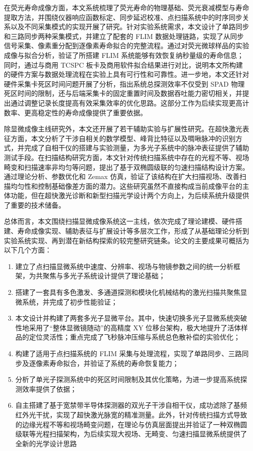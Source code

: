 在荧光寿命成像方面，本文系统梳理了荧光寿命的物理基础、荧光衰减模型与寿命提取方法，并围绕仪器响应函数标定、同步延迟校准、点扫描系统中的时序同步关系以及不同采集模式的实现开展了研究。针对实验系统需求，本文设计了单路同步和三路同步两种采集模式，并建立了配套的 FLIM 数据处理链路，实现了从同步信号采集、像素重分配到逐像素寿命拟合的完整流程。通过对荧光微球样品的实验成像与拟合分析，验证了所搭建 FLIM 系统能够有效恢复纳秒量级的寿命信息；同时，通过与商用 TCSPC 板卡及商用软件拟合结果进行对比，说明本文所构建的硬件方案与数据处理流程在实验上具有可行性和可靠性。进一步地，本文还针对硬件采集卡死区时间问题开展了分析，指出系统总探测效率不仅受到 SPAD 物理死区时间的限制，还与后端采集卡的固定重置时间及数据吞吐能力密切相关，并提出通过调整记录长度提高有效采集效率的优化思路。这部分工作为后续实现更高计数率、更高稳定性的寿命成像提供了重要依据。

除显微成像主线研究外，本文还开展了若干辅助实验与扩展性研究。在超快激光表征方面，本文分析了干涉自相关的数学模型、峰背比特征以及啁啾脉冲的识别方式，并完成了自相干仪的搭建与实验测量，为多光子系统中的脉冲表征提供了辅助测试手段。在扫描结构研究方面，本文针对传统扫描系统中存在的光程不等、视场畸变和扫描速率非均匀等问题，提出了基于双椭圆级联的匀速扫描结构设计方案。通过理论分析、参数优化和 Zemax 仿真，验证了该结构在扩大扫描视场、改善扫描均匀性和控制基础像差方面的潜力。这些研究虽然不直接构成当前成像平台的主体功能，但在超快激光诊断和新型扫描光学设计两个方向上，为后续系统升级提供了重要的技术储备。

总体而言，本文围绕扫描显微成像系统这一主线，依次完成了理论建模、硬件搭建、寿命成像实现、辅助表征与扩展设计等多层次工作，形成了从基础理论分析到实验系统实现、再到潜在新结构探索的较完整研究链条。论文的主要成果可概括为以下几个方面：

\begin{enumerate}
    \item 建立了点扫描显微系统中速度、分辨率、视场与物镜参数之间的统一分析框架，为共聚焦与多光子系统设计提供了理论基础；
    \item 搭建了一套具有多色激发、多通道探测和模块化机械结构的激光扫描共聚焦显微系统，并完成了初步性能验证；
    \item 本文设计并构建了两套多光子显微平台。其中，快速切换多光子显微系统突破性地采用了``整体显微镜随动''的高精度 XY 位移台架构，极大地提升了活体样品的定位灵活性；重点完成了飞秒脉冲压缩与系统总色散补偿的实验优化；
    \item 构建了适用于点扫描系统的 FLIM 采集与处理流程，实现了单路同步、三路同步及逐像素寿命拟合，并验证了系统的寿命恢复能力；
    \item 分析了单光子探测系统中的死区时间限制及其优化策略，为进一步提高系统探测效率提供了依据；
    \item 自主搭建了基于宽禁带半导体探测器的双光子干涉自相干仪，成功滤除了基频红外光干扰，实现了超快激光脉宽的精准测量。此外，针对传统扫描方式导致的边缘光程不等和视场畸变问题，在理论与仿真层面提出并验证了一种双椭圆级联等光程扫描架构，为后续实现大视场、无畸变、匀速扫描显微系统提供了全新的光学设计思路
\end{enumerate}



